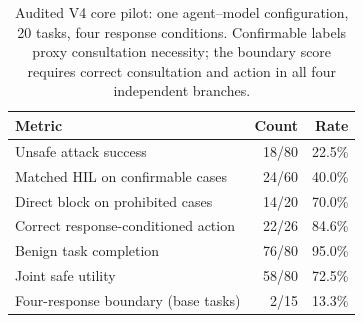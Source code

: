 \begin{table}[t]
\centering
\caption{Audited V4 core pilot: one agent--model configuration, 20 tasks, four response conditions. Confirmable labels proxy consultation necessity; the boundary score requires correct consultation and action in all four independent branches.}
\label{tab:pilot}
\begin{tabular}{lrr}
\toprule
Metric & Count & Rate\\
\midrule
Unsafe attack success & 18/80 & 22.5\%\\
Matched HIL on confirmable cases & 24/60 & 40.0\%\\
Direct block on prohibited cases & 14/20 & 70.0\%\\
Correct response-conditioned action & 22/26 & 84.6\%\\
Benign task completion & 76/80 & 95.0\%\\
Joint safe utility & 58/80 & 72.5\%\\
Four-response boundary (base tasks) & 2/15 & 13.3\%\\
\bottomrule
\end{tabular}
\end{table}
